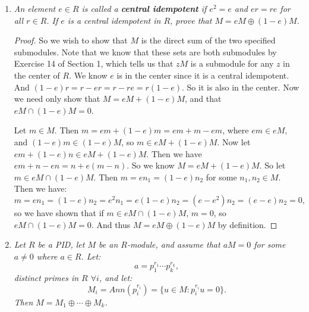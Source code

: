 \documentclass[12pt]{amsbook}
\theoremstyle{plain}
\numberwithin{section}{chapter}
\numberwithin{equation}{chapter}
\theoremstyle{definition}
\theoremstyle{remark}
\renewcommand{\phi}{\varphi}
\begin{document}
\begin{enumerate}[label=\arabic*.]
\begin{enumerate}
\begin{proof}
\textbf{Surjectivity: } Let $\phi \in H$, then we know $\phi: M \to A \times B$. Then the image of any element of $M$ under $\phi$ is a two dimensional vector whose first component lives in $A$, and whose second component lives in $B$. So let $\phi:M \to A$ be given by $\phi(m) = \phi(m)_1$, the first component of $\phi(m)$. and let $\psi(m) = \phi(m)_2$. Then $\Phi((\phi,\psi)) = (\phi,\psi) = \phi$. Hence $\Phi$ is surjective. 

\textbf{Injectivity: } Let $\Phi((\phi_1,\psi_1)) =(\phi_1,\psi_1) = (\phi_2,\psi_2) =  \Phi((\phi_2,\psi_2))$. Then we must have $\phi_1 = \phi_2$, and $\psi_1 = \psi_2$, since otherwise we do not have equality of these ordered pairs of hom-sms in $H$. But then we have shown that the arguments of $\Phi$ are equal in this case, so $\Phi$ must be injective. 
\end{proof}
\end{enumerate}

\setcounter{enumi}{14}
\item \textit{An element $e \in R$ is called a \textbf{central idempotent} if $e^2 = e$ and $er = re$ for all $r \in R$. If $e$ is a central idempotent in $R$, prove that $M = eM \oplus (1 - e)M$. }

\begin{proof}
So we wish to show that $M$ is the direct sum of the two specified submodules. Note that we know that these sets are both submodules by Exercise 14 of Section 1, which tells us that $zM$ is a submodule for any $z$ in the center of $R$. We know $e$ is in the center since it is a central idempotent. And $(1 - e)r = r - er = r - re = r(1 - e)$. So it is also in the center. Now we need only show that $M = eM + (1 - e)M$, and that $eM \cap (1 - e)M = 0$. 


Let $m \in M$. Then $m = em + (1 - e)m = em + m - em$, where $em \in eM$, and $(1 - e)m \in (1 - e)M$, so $m \in eM + (1 - e)M$. Now let $em + (1 - e)n \in eM + (1 - e)M$. Then we have $em + n - en = n + e(m - n)$. So we know $M = eM + (1 - e)M$. So let $m \in eM \cap (1 - e)M$. Then $m = en_1 = (1 - e)n_2$ for some $n_1,n_2 \in M$. Then we have: 
$$
m = en_1 = (1 - e)n_2 = e^2n_1 = e(1 - e)n_2 = (e - e^2)n_2 = (e - e)n_2 = 0,
$$
so we have shown that if $m \in eM \cap (1 - e)M$, $m = 0$, so $eM \cap (1 - e)M = 0$. And thus $M = eM \oplus (1 - e)M$ by definition. 
\end{proof}

\setcounter{enumi}{17}
\item \textit{Let $R$ be a PID, let $M$ be an $R$-module, and assume that $aM = 0$ for some $a \neq 0$ where $a \in R$. Let:
$$
a = p_1^{r_1}\cdots p_k^{r_k},
$$
distinct primes in $R$ $\forall i$, and let: $$
M_i = Ann(p_i^{r_i}) = \{u \in M: p_i^{r_i}u = 0\}.
$$
 Then $M = M_1 \oplus \cdots \oplus M_k$. }
 

\end{enumerate}
\end{document}
